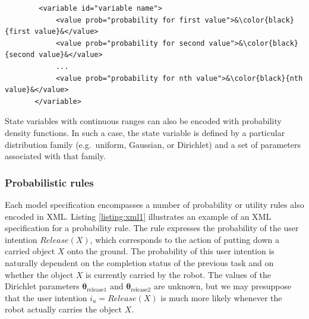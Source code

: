 \vspace{3mm}\begin{lstlisting}
        <variable id="variable name">
            <value prob="probability for first value">&\color{black}{first value}&</value>
            <value prob="probability for second value">&\color{black}{second value}&</value>
            ...
            <value prob="probability for nth value">&\color{black}{nth value}&</value>
       </variable>  
\end{lstlisting}\vspace{2mm}

State variables with continuous ranges can also be encoded with probability density functions. In such a case, the state variable is defined by a particular distribution family (e.g.\ uniform, Gaussian, or Dirichlet) and a set of parameters associated with that family. 

\subsubsection*{Probabilistic rules}

Each model specification encompasses a number of probability or utility rules also encoded in XML. Listing \ref{listing:xml1} illustrates an example of an XML specification for a probability rule. The rule expresses the probability of the user intention $\mathit{Release}(X)$, which corresponds to the action of putting down a carried object $X$ onto the ground.  The probability of this user intention is naturally dependent on the completion status of the previous task and on whether the object $X$ is currently carried by the robot. The values of the Dirichlet parameters $\boldsymbol\theta_{\text{release1}}$ and $\boldsymbol\theta_{\text{release2}}$ are unknown, but we may presuppose that the user intention $i_u = \mathit{Release}(X)$ is much more likely whenever the robot actually carries the object $X$. 

